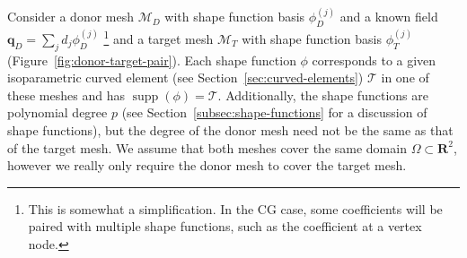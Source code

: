 \documentclass[oneside, reqno]{amsart}
\theoremstyle{definition}
\newcommand{\reals}{\mathbf{R}}
\begin{document}
Consider a donor mesh \(\mathcal{M}_D\) with shape function basis
\(\phi_D^{(j)}\) and a known field \(\bm{q}_D = \sum_j d_j \phi_D^{(j)}\)
\footnote{This is somewhat a simplification. In the CG case,
some coefficients will be paired with multiple shape functions, such
as the coefficient at a vertex node.}
and a
target mesh \(\mathcal{M}_T\) with shape function basis \(\phi_T^{(j)}\)
(Figure~\ref{fig:donor-target-pair}).
Each shape function \(\phi\) corresponds to a
given isoparametric curved element (see Section~\ref{sec:curved-elements})
\(\mathcal{T}\) in one of these meshes and has
\(\operatorname{supp}(\phi) = \mathcal{T}\).
Additionally, the shape functions are polynomial degree \(p\) (see
Section~\ref{subsec:shape-functions} for a discussion of shape functions),
but the degree of the donor mesh need not be the same as that of the
target mesh. We assume that both meshes cover the same domain \(\Omega \subset
\reals^2\), however we really only require the donor mesh to cover the
target mesh.
\end{document}
